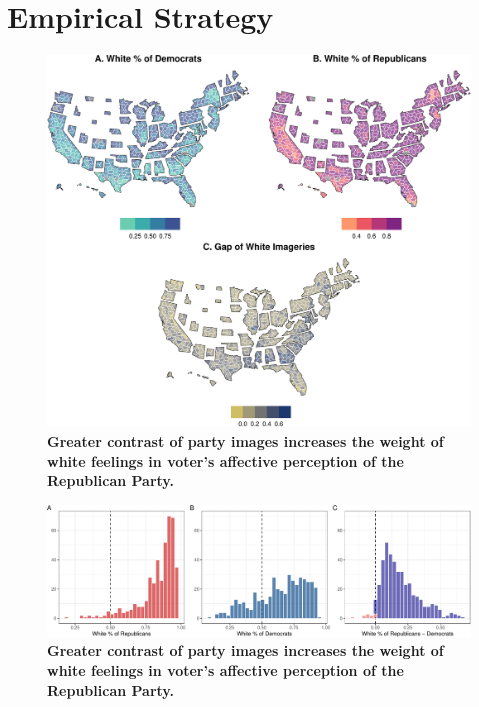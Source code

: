 \documentclass[
  12pt,
]{article}
\begin{document}
\hypertarget{empirical-strategy}{%
\section{Empirical Strategy}\label{empirical-strategy}}

\begin{figure}[tb]

{\centering \includegraphics{paper_files/figure-pdf/fig-map-1.pdf}

}

\caption{\label{fig-map}\textbf{Greater contrast of party images
increases the weight of white feelings in voter's affective perception
of the Republican Party.}}

\end{figure}

\begin{figure}[tb]

{\centering \includegraphics{paper_files/figure-pdf/fig-hist-1.pdf}

}

\caption{\label{fig-hist}\textbf{Greater contrast of party images
increases the weight of white feelings in voter's affective perception
of the Republican Party.}}

\end{figure}
\end{document}

